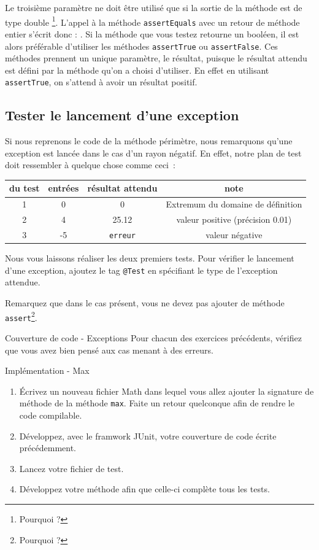 \documentclass[a4paper,11pt]{article}
\begin{document}
	Le troisième paramètre ne doit être utilisé que si la sortie de la méthode est de type double \footnote{Pourquoi ?}.
	L’appel à la méthode \texttt{assertEquals} avec un retour de méthode entier s’écrit donc :
	.
	Si la méthode que vous testez retourne un booléen, il est alors préférable d’utiliser les méthodes \texttt{assertTrue} ou \texttt{assertFalse}. Ces méthodes prennent un unique paramètre, le résultat, puisque le résultat attendu est défini par la méthode qu'on a choisi d'utiliser. En effet en utilisant \texttt{assertTrue}, on s’attend à avoir un résultat positif.

	\subsection{Tester le lancement d'une exception}
	Si nous reprenons le code de la méthode périmètre, nous remarquons qu'une exception est lancée dans le cas d'un rayon négatif. En effet, notre plan de test doit ressembler à quelque chose comme ceci~:

	\begin{center}
		\begin{tabular}{|c|c|c|c|}
			\hline
			\no du test & entrées & résultat attendu & note \\
			\hline
			1 & 0 & 0 & Extremum du domaine de définition \\
			\hline
			2 & 4 & 25.12 & valeur positive (précision 0.01) \\
			\hline
			3 & -5 & \texttt{erreur} & valeur négative \\
			\hline
		\end{tabular}
	\end{center}

	Nous vous laissons réaliser les deux premiers tests. Pour vérifier le lancement d'une exception, ajoutez le tag \texttt{@Test} en spécifiant le type de l'exception attendue.

	Remarquez que dans le cas présent, vous ne devez pas ajouter de méthode \texttt{assert}\footnote{Pourquoi ?}.

	\begin{Exercice}{Couverture de code - Exceptions}
		Pour chacun des exercices précédents, vérifiez que vous avez bien pensé aux cas menant à des erreurs.
	\end{Exercice}

	\begin{Exercice}{Implémentation - Max}
		\begin{enumerate}
			\item Écrivez un nouveau fichier Math dans lequel vous allez ajouter la signature de méthode de la méthode \texttt{max}. Faite un retour quelconque afin de rendre le code compilable.
			\item Développez, avec le framwork JUnit, votre couverture de code écrite précédemment.
			\item Lancez votre fichier de test.
			\item Développez votre méthode afin que celle-ci complète tous les tests.
		\end{enumerate}
	\end{Exercice}
\end{document}
